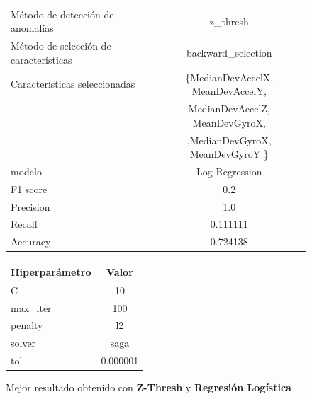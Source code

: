 \begin{appendices}
		\begin{figure}[htb]
			\centering
			\caption{Mejor resultado obtenido con \textbf{Z-Thresh} y \textbf{Regresión Logística}}
			\label{table:29}
			\begin{tabular}{lc}
				\toprule
					  Método de detección de anomalías &                                           z\_thresh \\
				Método de selección de características &                                 backward\_selection \\
						 Características seleccionadas & \{MedianDevAccelX, MeanDevAccelY, \\ 
						                               &  MedianDevAccelZ, MeanDevGyroX, \\
						 							   &    ,MedianDevGyroX, MeanDevGyroY \}\\		
												modelo &                                     Log Regression \\
											  F1 score &                                                0.2 \\
											 Precision &                                                1.0 \\
												Recall &                                           0.111111 \\
											  Accuracy &                                           0.724138 \\
				\bottomrule
			\end{tabular}
			\newline
			\newline

			\begin{tabular}{lc}
				\toprule
				Hiperparámetro &     Valor \\
				\midrule
							 C &        10 \\
					  max\_iter &       100 \\
					   penalty &        l2 \\
						solver &      saga \\
						   tol &  0.000001 \\
				\bottomrule
			\end{tabular}
			
		\end{figure}


\end{appendices}
